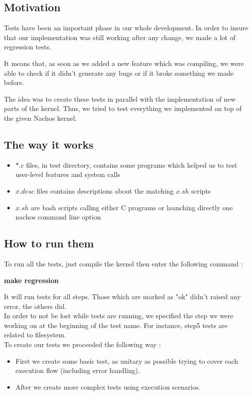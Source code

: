 \subsection{Motivation}
Tests have been an important phase in our whole development. In order to insure
that our implementation was still working after any change, we made a lot of
regression tests. 

It means that, as soon as we added a new feature which was compiling, we were
able to check if it didn't generate any bugs or if it broke something we made before.

The idea was to create these tests in parallel with the implementation of new
parts of the kernel. Thus, we tried to test everything we implemented on top of
the given Nachos kernel.

\subsection{The way it works}
\begin{itemize}
    \item $*.c$ files, in test directory, contains some programs which helped us to
        test user-level features and system calls
    \item $x.desc$ files contains descriptions about the matching $x.sh$ scripts
    \item $x.sh$ are bash scripts calling either C programs or launching directly
        one nachos command line option
\end{itemize}


\subsection{How to run them}
To run all the tests, just compile the kernel then enter the following command :

\textbf{make regression}

It will run tests for all steps. Those which are marked as "ok" didn't raised
any error, the others did.\\

In order to not be lost while tests are running, we specified the step we were
working on at the beginning of the test name. For instance, step5 tests are
related to filesystem.\\

To create our tests we proceeded the following way :
\begin{itemize}
    \item First we create some basic test, as unitary as possible trying to
        cover each execution flow (including error handling). 
    \item After we create more complex tests using execution scenarios.
\end{itemize}

